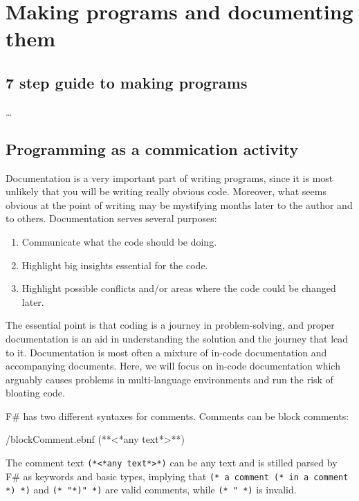 \documentclass[fsharpNotes.tex]{subfiles}
\begin{document}
\chapter{Making programs and documenting them}


\section{7 step guide to making programs}
\dots

\section{Programming as a commication activity}
\label{chap:documentation}
Documentation is a very important part of writing programs, since it is most unlikely that you will be writing really obvious code. Moreover, what seems obvious at the point of writing may be mystifying months later to the author and to others. Documentation serves several purposes:
\begin{enumerate}
\item Communicate what the code should be doing.
\item Highlight big insights essential for the code.
\item Highlight possible conflicts and/or areas where the code could be changed later.
\end{enumerate}
The essential point is that coding is a journey in problem-solving, and proper documentation is an aid in understanding the solution and the journey that lead to it. Documentation is most often a mixture of in-code documentation and accompanying documents. Here, we will focus on in-code documentation which arguably causes problems in multi-language environments and run the risk of bloating code.

F\# has two different syntaxes for comments. Comments can be block
comments: 
%
\begin{verbatimwrite}{\ebnf/blockComment.ebnf}
(**<*any text*>**)
\end{verbatimwrite}
%
The comment text \lstinline[language=syntax]{(*<*any text*>*)} can be any text and is stilled parsed by F\# as keywords and basic types, implying that \lstinline!(* a comment (* in a comment *) *)! and \lstinline[morecomment={[l][\color{commentsColor}]{(*}}]!(* "*)" *)! are valid comments, while \lstinline!(* " *)! is invalid.
\end{document}
